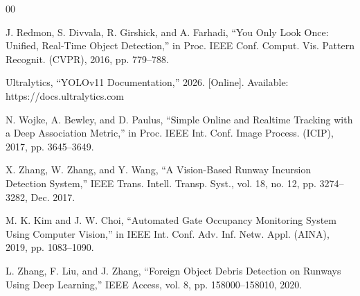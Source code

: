 \documentclass[conference]{IEEEtran}
\begin{document}
\begin{thebibliography}{00}


 J. Redmon, S. Divvala, R. Girshick, and A. Farhadi, ``You Only Look Once: Unified, Real-Time Object Detection,'' in Proc. IEEE Conf. Comput. Vis. Pattern Recognit. (CVPR), 2016, pp. 779--788.

 Ultralytics, ``YOLOv11 Documentation,'' 2026. [Online]. Available: https://docs.ultralytics.com

 N. Wojke, A. Bewley, and D. Paulus, ``Simple Online and Realtime Tracking with a Deep Association Metric,'' in Proc. IEEE Int. Conf. Image Process. (ICIP), 2017, pp. 3645--3649.

 X. Zhang, W. Zhang, and Y. Wang, ``A Vision-Based Runway Incursion Detection System,'' IEEE Trans. Intell. Transp. Syst., vol. 18, no. 12, pp. 3274--3282, Dec. 2017.

 M. K. Kim and J. W. Choi, ``Automated Gate Occupancy Monitoring System Using Computer Vision,'' in IEEE Int. Conf. Adv. Inf. Netw. Appl. (AINA), 2019, pp. 1083--1090.

 L. Zhang, F. Liu, and J. Zhang, ``Foreign Object Debris Detection on Runways Using Deep Learning,'' IEEE Access, vol. 8, pp. 158000--158010, 2020.

\end{thebibliography}
\end{document}
